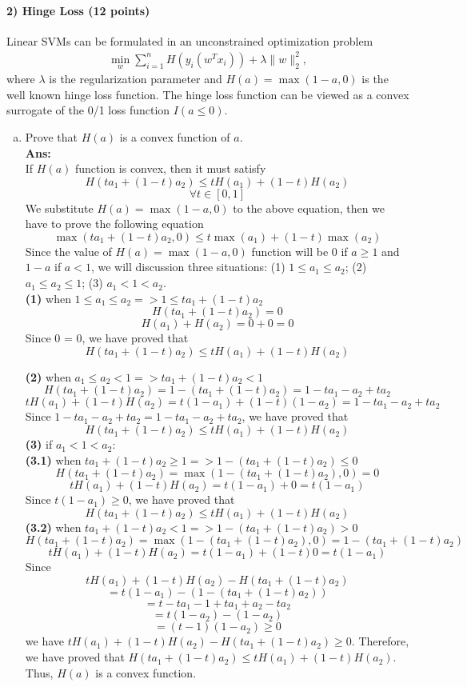 \documentclass[11pt]{article}
\begin{document}

\paragraph{2) Hinge Loss (12 points)}

Linear SVMs can be formulated in an unconstrained optimization problem
\begin{align}\label{SVM}
\min_{w}\sum_{i=1}^n H(y_i(w^Tx_i)) + \lambda\|w\|_2^2,
\end{align}
where $\lambda$ is the regularization parameter and $H(a) = \max(1-a,0)$ is the well known hinge loss function. The hinge loss function can be viewed as a convex surrogate of the 0/1 loss function $I(a \leq 0)$.
\begin{enumerate}[(a)]
\item Prove that $H(a)$ is a convex function of $a$.\\
\textbf{Ans:}\\
If $H(a)$ function is convex, then it must satisfy
$$H(ta_1 + (1-t)a_2) \leq tH(a_1) + (1-t)H(a_2)$$
$$\forall t \in [0,1]$$
We substitute $H(a) = \max(1-a, 0)$ to the above equation, then we have to prove the following equation
$$\max(ta_1 + (1-t)a_2, 0) \leq t\max(a_1) + (1-t)\max(a_2)$$
Since the value of $H(a) = \max(1-a, 0)$ function will be 0 if $a \geq 1$ and $1-a$ if $a < 1$, we will discussion three situations: (1) $1 \leq a_1 \leq a_2$; (2) $a_1 \leq a_2 \leq 1$; (3) $a_1 < 1 < a_2$.\\
\textbf{(1)} when $1 \leq a_1 \leq a_2 => 1 \leq ta_1 + (1-t)a_2$
$$H(ta_1 + (1-t)a_2) = 0$$
$$H(a_1) + H(a_2) = 0 + 0 = 0$$
Since 0 = 0, we have proved that 
$$H(ta_1 + (1-t)a_2) \leq tH(a_1) + (1-t)H(a_2)$$

\textbf{(2)} when $a_1 \leq a_2 < 1 => ta_1 + (1-t)a_2 < 1$\\
$$H(ta_1 + (1-t)a_2) = 1 - (ta_1 + (1-t)a_2) = 1 - ta_1 - a_2 + ta_2$$
$$tH(a_1) + (1-t)H(a_2) = t(1-a_1) + (1-t)(1-a_2) = 1 - ta_1 - a_2 + ta_2$$
Since $1 - ta_1 - a_2 + ta_2 = 1 - ta_1 - a_2 + ta_2$, we have proved that 
$$H(ta_1 + (1-t)a_2) \leq tH(a_1) + (1-t)H(a_2)$$
\textbf{(3)} if $a_1 < 1 < a_2$:\\
\textbf{(3.1)} when $ta_1 + (1-t)a_2 \geq 1 => 1- (ta_1 + (1-t)a_2) \leq 0$
$$H(ta_1 + (1-t)a_2) = \max(1- (ta_1 + (1-t)a_2),0) = 0$$
$$tH(a_1) + (1-t)H(a_2) = t(1-a_1) + 0 = t(1-a_1)$$
Since $t(1-a_1) \geq 0$, we have proved that 
$$H(ta_1 + (1-t)a_2) \leq tH(a_1) + (1-t)H(a_2)$$
\textbf{(3.2)} when $ta_1 + (1-t)a_2 < 1 => 1- (ta_1 + (1-t)a_2) > 0$
$$H(ta_1 + (1-t)a_2) = \max(1 - (ta_1 + (1-t)a_2), 0) = 1 - (ta_1 + (1-t)a_2)$$
$$tH(a_1) + (1-t)H(a_2) = t(1-a_1) + (1-t)0 = t(1-a_1)$$
Since 
$$tH(a_1) + (1-t)H(a_2) - H(ta_1 + (1-t)a_2)$$ 
$$= t(1-a_1) - (1 - (ta_1 + (1-t)a_2))$$
$$= t - ta_1 - 1 + ta_1 + a_2 - ta_2$$
$$= t(1-a_2) - (1-a_2)$$
$$= (t-1)(1-a_2) \geq 0$$
we have $tH(a_1) + (1-t)H(a_2) - H(ta_1 + (1-t)a_2) \geq 0$.
Therefore, we have proved that $H(ta_1 + (1-t)a_2) \leq tH(a_1) + (1-t)H(a_2)$. Thus, $H(a)$ is a convex function.\\


\end{enumerate}
\end{document}
